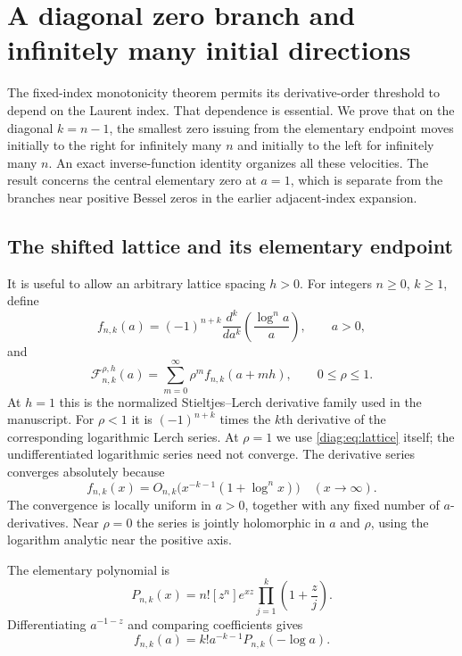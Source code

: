 \section{A diagonal zero branch and infinitely many initial directions}
\label{diag:sec:main}

The fixed-index monotonicity theorem permits its derivative-order threshold
to depend on the Laurent index.  That dependence is essential.  We prove
that on the diagonal $k=n-1$, the smallest zero issuing from the elementary
endpoint moves initially to the right for infinitely many $n$ and initially
to the left for infinitely many $n$.  An exact inverse-function identity
organizes all these velocities.  The result concerns the central elementary
zero at $a=1$, which is separate from the branches near positive Bessel zeros
in the earlier adjacent-index expansion.

\subsection{The shifted lattice and its elementary endpoint}
\label{diag:subsec:lattice}

It is useful to allow an arbitrary lattice spacing $h>0$.  For integers
$n\geq0$, $k\geq1$, define
\begin{equation}\label{diag:eq:f}
 f_{n,k}(a)=(-1)^{n+k}\frac{d^k}{da^k}
                 \left(\frac{\log^n a}{a}\right),\qquad a>0,
\end{equation}
and
\begin{equation}\label{diag:eq:lattice}
 \mathscr F_{n,k}^{\rho,h}(a)
       =\sum_{m=0}^{\infty}\rho^m f_{n,k}(a+mh),
       \qquad 0\leq\rho\leq1.
\end{equation}
At $h=1$ this is the normalized Stieltjes--Lerch derivative family used in
the manuscript.  For $\rho<1$ it is $(-1)^{n+k}$ times the $k$th derivative
of the corresponding logarithmic Lerch series.  At $\rho=1$ we use
\eqref{diag:eq:lattice} itself; the undifferentiated logarithmic series need
not converge.  The derivative series converges absolutely because
\[
 f_{n,k}(x)=O_{n,k}\bigl(x^{-k-1}(1+\log^n x)\bigr)
 \quad(x\longrightarrow\infty).
\]
The convergence is locally uniform in $a>0$, together with any fixed
number of $a$-derivatives.  Near $\rho=0$ the series is jointly holomorphic
in $a$ and $\rho$, using the logarithm analytic near the positive axis.

The elementary polynomial is
\begin{equation}\label{diag:eq:P}
 P_{n,k}(x)=n![z^n]e^{xz}\prod_{j=1}^{k}\left(1+\frac zj\right).
\end{equation}
Differentiating $a^{-1-z}$ and comparing coefficients gives
\begin{equation}\label{diag:eq:elementary}
 f_{n,k}(a)=k!a^{-k-1}P_{n,k}(-\log a).
\end{equation}

